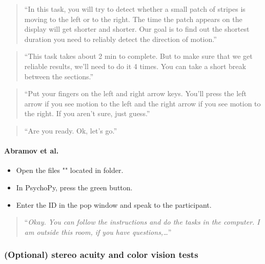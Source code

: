 \documentclass[]{article}
\providecommand{\tightlist}{%
  \setlength{\itemsep}{0pt}\setlength{\parskip}{0pt}}
\let\oldparagraph\paragraph
\renewcommand{\paragraph}[1]{\oldparagraph{#1}\mbox{}}
\begin{document}
\begin{quote}
``In this task, you will try to detect whether a small patch of stripes
is moving to the left or to the right. The time the patch appears on the
display will get shorter and shorter. Our goal is to find out the
shortest duration you need to reliably detect the direction of motion.''
\end{quote}

\begin{quote}
``This task takes about 2 min to complete. But to make sure that we get
reliable results, we'll need to do it 4 times. You can take a short
break between the sections.''
\end{quote}

\begin{quote}
``Put your fingers on the left and right arrow keys. You'll press the
left arrow if you see motion to the left and the right arrow if you see
motion to the right. If you aren't sure, just guess.''
\end{quote}

\begin{quote}
``Are you ready. Ok, let's go.''
\end{quote}

\hypertarget{abramov-et-al.}{%
\paragraph{Abramov et al.}\label{abramov-et-al.}}

\begin{itemize}
\tightlist
\item
  Open the files "" located in folder.
\item
  In PsychoPy, press the green button.
\item
  Enter the ID in the pop window and speak to the participant.
\end{itemize}

\begin{quote}
``\emph{Okay. You can follow the instructions and do the tasks in the
computer. I am outside this room, if you have questions,\ldots{}}''
\end{quote}

\hypertarget{optional-stereo-acuity-and-color-vision-tests}{%
\subsubsection{(Optional) stereo acuity and color vision
tests}\label{optional-stereo-acuity-and-color-vision-tests}}
\end{document}
